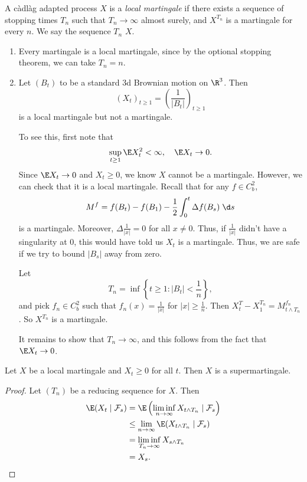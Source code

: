 \documentclass[a4paper]{article}
\begin{document}
\begin{defi}
  A c\`adl\`ag adapted process $X$ is a \emph{local martingale} if there exists a sequence of stopping times $T_n$ such that $T_n \to \infty$ almost surely, and $X^{T_n}$ is a martingale for every $n$. We say the sequence $T_n$  $X$.
\end{defi}

\begin{eg}\leavevmode
  \begin{enumerate}
    \item Every martingale is a local martingale, since by the optional stopping theorem, we can take $T_n = n$.
    \item Let $(B_t)$ to be a standard 3d Brownian motion on $\R^3$. Then
      \[
        (X_t)_{t \geq 1} = \left(\frac{1}{|B_t|}\right)_{t \geq 1}
      \]
      is a local martingale but not a martingale.

      To see this, first note that
      \[
        \sup_{t \geq 1} \E X_t^2 < \infty,\quad \E X_t \to 0.
      \]
      Since $\E X_t \to 0$ and $X_t \geq 0$, we know $X$ cannot be a martingale. However, we can check that it is a local martingale. Recall that for any $f \in C^2_b$,
      \[
        M^f = f(B_t) - f(B_1) - \frac{1}{2} \int_0^t \Delta f(B_s)\;\d s
      \]
      is a martingale. Moreover, $\Delta \frac{1}{|x|} = 0$ for all $x \not= 0$. Thus, if $\frac{1}{|x|}$ didn't have a singularity at $0$, this would have told us $X_t$ is a martingale. Thus, we are safe if we try to bound $|B_s|$ away from zero.

      Let
      \[
        T_n = \inf \left\{t \geq 1: |B_t| < \frac{1}{n}\right\},
      \]
      and pick $f_n \in C_b^2$ such that $f_n(x) = \frac{1}{|x|}$ for $|x| \geq \frac{1}{n}$. Then $X_t^T - X_1^{T_n} = M^{f_n}_{t \wedge T_n}$. So $X^{T_n}$ is a martingale.

      It remains to show that $T_n \to \infty$, and this follows from the fact that $\E X_t \to 0$.
  \end{enumerate}
\end{eg}

\begin{prop}
  Let $X$ be a local martingale and $X_t \geq 0$ for all $t$. Then $X$ is a supermartingale.
\end{prop}

\begin{proof}
  Let $(T_n)$ be a reducing sequence for $X$. Then
  \begin{align*}
    \E(X_t \mid \mathcal{F}_s) &= \E \left(\liminf_{n \to \infty} X_{t \wedge T_n} \mid \mathcal{F}_s\right) \\
    &\leq \lim_{n \to \infty} \E(X_{t \wedge T_n} \mid \mathcal{F}_s) \\
    &= \liminf_{T_n \to \infty} X_{s \wedge T_n} \\
    &= X_s.\qedhere
  \end{align*}
\end{proof}
\end{document}
